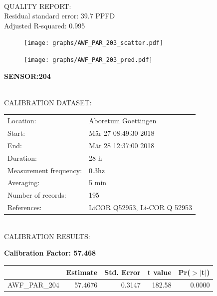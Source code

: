 \documentclass[oneside]{report}
\begin{document}
\hrulefill\\
QUALITY REPORT:\\
Residual standard error: 39.7 PPFD\\
Adjusted R-squared: 0.995



\begin{figure}[H]
  \centering
  \texttt{[image: graphs/AWF\_PAR\_203\_scatter.pdf]}
\end{figure}




\begin{figure}[H]
  \centering
  \texttt{[image: graphs/AWF\_PAR\_203\_pred.pdf]}
\end{figure}

\pagebreak


\begin{center}
\large{\textbf{SENSOR:204}}\\
\end{center}

\hrulefill\\
CALIBRATION DATASET:\\
\begin{table}[h!]
  \centering
  \label{tab:table1}
  \begin{tabular}{ll}
    Location: & Aboretum Goettingen\\ 
    
    
    Start:  & Mär 27 08:49:30 2018 \\
    End:   & Mär 28 12:37:00 2018\\ 
    Duration: & 28 h\\
    Measurement frequency: & 0.3hz\\
    Averaging:  &5 min\\
    Number of records: & 195 \\
    References: & LiCOR Q52953, Li-COR Q 52953 \\
  \end{tabular}
\end{table}

\hrulefill\\
CALIBRATION RESULTS:\\


\begin{center}
\textbf{\large{Calibration Factor: 57.468}}\\
\end{center}
\begin{table}[ht]
\centering
\begin{tabular}{rrrrr}
  \hline
 & Estimate & Std. Error & t value & Pr($>$$|$t$|$) \\ 
  \hline
AWF\_PAR\_204 & 57.4676 & 0.3147 & 182.58 & 0.0000 \\ 
   \hline
\end{tabular}
\end{table}
\end{document}
